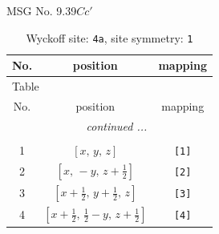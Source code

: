 \documentclass[fleqn,8pt]{jsarticle}
\begin{document}
\setcounter{MaxMatrixCols}{32}

\renewcommand{\tablename}{Table~}
\renewcommand{\figurename}{Figure~}
\begin{center}
\LARGE
MSG No. 9.39\quad$Cc'$
\end{center}
\renewcommand{\arraystretch}{1.2}
\begin{longtable}{ccc}
\caption{Wyckoff site: {\tt 4a}, site symmetry: {\tt 1}}
 \\
 \hline \hline
No. & position & mapping \\ \hline \endfirsthead

\multicolumn{2}{l}{\tablename\ \thetable{}} \\
 \hline \hline
No. & position & mapping \\ \hline \endhead

 \hline \hline
\multicolumn{2}{r}{\footnotesize\it continued ...} \\ \endfoot

 \hline \hline
\multicolumn{2}{r}{} \\ \endlastfoot

1 & $\left[ x,\, y,\, z \right]$ & {\tt [1]} \\ \hline
2 & $\left[ x,\, - y,\, z + \frac{1}{2} \right]$ & {\tt [2]} \\ \hline
3 & $\left[ x + \frac{1}{2},\, y + \frac{1}{2},\, z \right]$ & {\tt [3]} \\ \hline
4 & $\left[ x + \frac{1}{2},\, \frac{1}{2} - y,\, z + \frac{1}{2} \right]$ & {\tt [4]} \\
\end{longtable}
\end{document}
